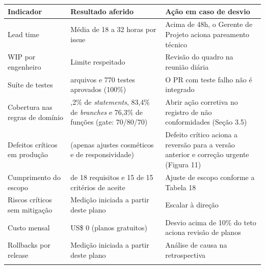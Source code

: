{\footnotesize
\begin{tabularx}{\textwidth}{>{\hsize=0.573\hsize\sloppy\arraybackslash}X >{\hsize=1.119\hsize\sloppy\arraybackslash}X >{\hsize=1.308\hsize\sloppy\arraybackslash}X}
\arrayrulecolor{GithubTableBorder}\toprule
\rowcolor{BrandTableHeader}
\textbf{Indicador} & \textbf{Resultado aferido} & \textbf{Ação em caso de desvio} \\
\midrule
\arrayrulecolor{BrandGrayRule}
Lead time & Média de 18 a 32 horas por issue & Acima de 48h, o Gerente de Projeto aciona pareamento técnico \\
\midrule
WIP por engenheiro & Limite respeitado & Revisão do quadro na reunião diária \\
\midrule
Suíte de testes & 26 arquivos e 770 testes aprovados (100\%) & O PR com teste falho não é integrado \\
\midrule
Cobertura nas regras de domínio & 71,2\% de \emph{statements}, 83,4\% de \emph{branches} e 76,3\% de funções (gate: 70/80/70) & Abrir ação corretiva no registro de não conformidades (Seção 3.5) \\
\midrule
Defeitos críticos em produção & 0 (apenas ajustes cosméticos e de responsividade) & Defeito crítico aciona a reversão para a versão anterior e correção urgente (Figura 11) \\
\midrule
Cumprimento do escopo & 18 de 18 requisitos e 15 de 15 critérios de aceite & Ajuste de escopo conforme a Tabela 18 \\
\midrule
Riscos críticos sem mitigação & Medição iniciada a partir deste plano & Escalar à direção \\
\midrule
Custo mensal & US\$ 0 (planos gratuitos) & Desvio acima de 10\% do teto aciona revisão de planos \\
\midrule
Rollbacks por release & Medição iniciada a partir deste plano & Análise de causa na retrospectiva \\
\arrayrulecolor{GithubTableBorder}\bottomrule
\end{tabularx}%
}

